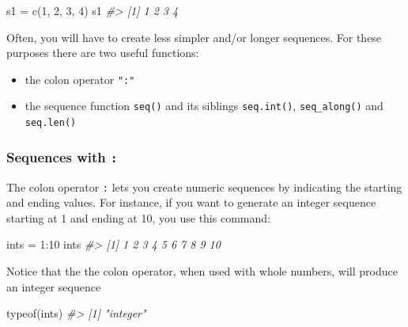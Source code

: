 \documentclass[
]{book}
\newenvironment{Shaded}{\begin{snugshade}}{\end{snugshade}}
\newcommand{\CommentTok}[1]{\textcolor[rgb]{0.56,0.35,0.01}{\textit{#1}}}
\newcommand{\DecValTok}[1]{\textcolor[rgb]{0.00,0.00,0.81}{#1}}
\newcommand{\FunctionTok}[1]{\textcolor[rgb]{0.00,0.00,0.00}{#1}}
\newcommand{\NormalTok}[1]{#1}
\newcommand{\OtherTok}[1]{\textcolor[rgb]{0.56,0.35,0.01}{#1}}
\newcommand{\SpecialCharTok}[1]{\textcolor[rgb]{0.00,0.00,0.00}{#1}}
\begin{document}
\begin{Shaded}
\begin{Highlighting}[]
\NormalTok{s1 }\OtherTok{=} \FunctionTok{c}\NormalTok{(}\DecValTok{1}\NormalTok{, }\DecValTok{2}\NormalTok{, }\DecValTok{3}\NormalTok{, }\DecValTok{4}\NormalTok{)}
\NormalTok{s1}
\CommentTok{\#\textgreater{} [1] 1 2 3 4}
\end{Highlighting}
\end{Shaded}

Often, you will have to create less simpler and/or longer sequences. For these
purposes there are two useful functions:

\begin{itemize}
\item
  the colon operator \texttt{":"}
\item
  the sequence function \texttt{seq()} and its siblings \texttt{seq.int()}, \texttt{seq\_along()}
  and \texttt{seq.len()}
\end{itemize}

\hypertarget{sequences-with}{%
\subsubsection*{\texorpdfstring{Sequences with \texttt{:}}{Sequences with :}}\label{sequences-with}}

The colon operator \texttt{:} lets you create numeric sequences by indicating the
starting and ending values. For instance, if you want to generate an integer
sequence starting at 1 and ending at 10, you use this command:

\begin{Shaded}
\begin{Highlighting}[]
\NormalTok{ints }\OtherTok{=} \DecValTok{1}\SpecialCharTok{:}\DecValTok{10}
\NormalTok{ints}
\CommentTok{\#\textgreater{}  [1]  1  2  3  4  5  6  7  8  9 10}
\end{Highlighting}
\end{Shaded}

Notice that the the colon operator, when used with whole numbers, will produce
an integer sequence

\begin{Shaded}
\begin{Highlighting}[]
\FunctionTok{typeof}\NormalTok{(ints)}
\CommentTok{\#\textgreater{} [1] "integer"}
\end{Highlighting}
\end{Shaded}
\end{document}
